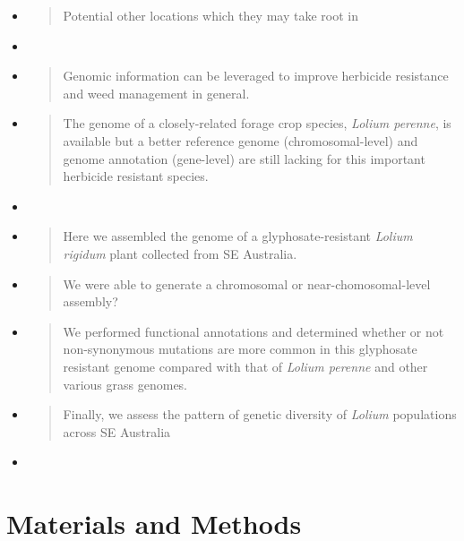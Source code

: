 \begin{itemize}
\item
  \begin{quote}
  Potential other locations which they may take root in
  \end{quote}
\item
\item
  \begin{quote}
  Genomic information can be leveraged to improve herbicide resistance
  and weed management in general.
  \end{quote}
\item
  \begin{quote}
  The genome of a closely-related forage crop species, \emph{Lolium
  perenne}, is available but a better reference genome
  (chromosomal-level) and genome annotation (gene-level) are still
  lacking for this important herbicide resistant species.
  \end{quote}
\item
\item
  \begin{quote}
  Here we assembled the genome of a glyphosate-resistant \emph{Lolium
  rigidum} plant collected from SE Australia.
  \end{quote}
\item
  \begin{quote}
  We were able to generate a chromosomal or near-chomosomal-level
  assembly?
  \end{quote}
\item
  \begin{quote}
  We performed functional annotations and determined whether or not
  non-synonymous mutations are more common in this glyphosate resistant
  genome compared with that of \emph{Lolium perenne} and other various
  grass genomes.
  \end{quote}
\item
  \begin{quote}
  Finally, we assess the pattern of genetic diversity of \emph{Lolium}
  populations across SE Australia
  \end{quote}
\item
\end{itemize}

\hypertarget{materials-and-methods}{%
\section{Materials and Methods}\label{materials-and-methods}}

